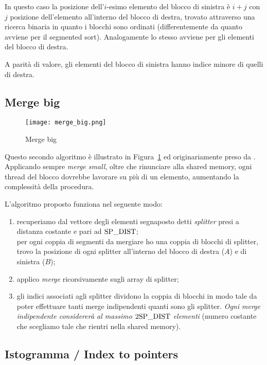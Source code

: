 In questo caso la posizione dell'$i$-esimo elemento del blocco di sinistra è $i+j$ con $j$ posizione dell'elemento all'interno del blocco di destra, trovato attraverso una ricerca binaria in quanto i blocchi sono ordinati (differentemente da quanto avviene per il segmented sort). Analogamente lo stesso avviene per gli elementi del blocco di destra. 

A parità di valore, gli elementi del blocco di sinistra hanno indice minore di quelli di destra. 

\subsection{Merge big}

\begin{figure}[t]
    \centering
	\texttt{[image: merge\_big.png]}
	\caption{Merge big}
	\label{merge_big}
\end{figure}

Questo secondo algoritmo è illustrato in Figura~\ref{merge_big} ed originariamente preso da \cite{mergebig}. Applicando sempre \emph{merge small}, oltre che rinunciare alla shared memory, ogni thread del blocco dovrebbe lavorare su più di un elemento, aumentando la complessità della procedura. 

L'algoritmo proposto funziona nel seguente modo:
\begin{enumerate}
    \item recuperiamo dal vettore degli elementi segnaposto detti \emph{splitter} presi a distanza costante e pari ad $\textrm{SP\_DIST}$; \\
    per ogni coppia di segmenti da mergiare ho una coppia di blocchi di splitter, trovo la posizione di ogni splitter all'interno del blocco di destra ($A$) e di sinistra ($B$);
    \item applico \emph{merge} ricorsivamente sugli array di splitter;
    \item gli indici associati agli splitter dividono la coppia di blocchi in modo tale da poter effettuare tanti merge indipendenti quanti sono gli splitter. \emph{Ogni merge indipendente considererà al massimo $2\textrm{SP\_DIST}$ elementi} (numero costante che scegliamo tale che rientri nella shared memory).
\end{enumerate}

\subsection{Istogramma / Index to pointers}

